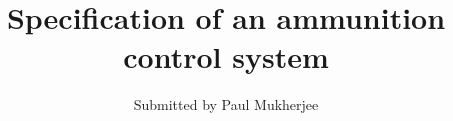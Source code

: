 \documentclass{article}
\begin{document}
\title{Specification of an ammunition control system}
\author{Submitted by Paul Mukherjee}
\maketitle

\begin{vdm}

\end{vdm}

\printindex
\end{document}
